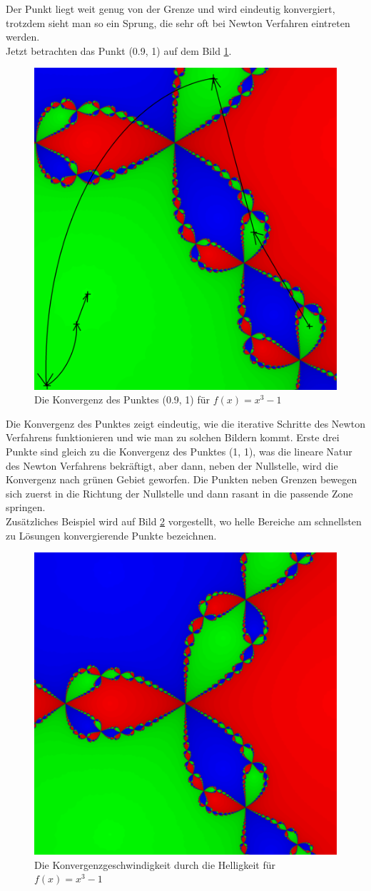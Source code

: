 \documentclass[a4paper,12pt]{llncs}
\numberwithin{equation}{section}
\begin{document}
Der Punkt liegt weit genug von der Grenze und wird eindeutig konvergiert, trotzdem sieht man so ein Sprung, die sehr oft bei Newton Verfahren eintreten werden.\\
Jetzt betrachten das Punkt (0.9, 1) auf dem Bild \ref{fig:output_points_g3}.
  \begin{figure}[ht]   
  	\centering
  	\includegraphics[width=.5\linewidth]{figures/output_points_g3}
  	\caption{Die Konvergenz des Punktes (0.9, 1) für $f(x)=x^3-1$ }
  	\label{fig:output_points_g3}
  \end{figure}
Die Konvergenz des Punktes zeigt eindeutig, wie die iterative Schritte des Newton Verfahrens funktionieren und wie man zu solchen Bildern kommt. 
Erste drei Punkte sind gleich zu die Konvergenz des Punktes (1, 1), was die lineare Natur des Newton Verfahrens bekräftigt, aber dann, neben der Nullstelle, wird die Konvergenz nach grünen Gebiet geworfen.
Die Punkten neben Grenzen bewegen sich zuerst in die Richtung der Nullstelle und dann rasant in die passende Zone springen.\\
Zusätzliches Beispiel wird auf Bild \ref{fig:output3_3} vorgestellt, wo helle Bereiche am schnellsten zu Lösungen konvergierende Punkte bezeichnen.
\begin{figure}[ht]   
	\centering
	\includegraphics[width=.5\linewidth]{figures/output3_3}
	\caption{Die Konvergenzgeschwindigkeit durch die Helligkeit für $f(x)=x^3-1$ }
	\label{fig:output3_3}
\end{figure}
\end{document}
